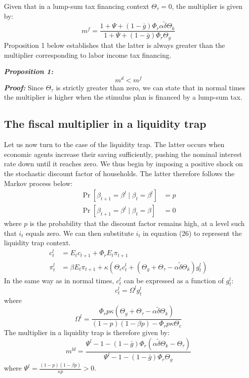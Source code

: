 \documentclass[12pt,letterpaper]{article}
\newcommand{\Et}{E_t}
\newcommand{\gbar}{\bar{g}}
\newcommand{\dtilde}{\tilde{\delta}}
\newcommand{\Theg}{\Theta_g}
\newcommand{\Thec}{\Theta_c}
\newcommand{\Thek}{\Theta_k}
\newcommand{\Thet}{\Theta_\tau}
\newcommand{\Phir}{\Phi_r}
\begin{document}
Given that in a lump-sum tax financing context $\Thet = 0$, the multiplier is given by:
\begin{equation}
m^f = \frac{1 + \Psi + (1-\gbar)\Phir\alpha\dtilde\Thek}{1 + \Psi + (1-\gbar)\Phir\Theg} \tag{45}
\end{equation}
Proposition 1 below establishes that the latter is always greater than the multiplier corresponding to labor income tax financing.

\medskip
\noindent\textbf{\emph{Proposition 1:}}
\begin{equation}
m^d < m^f \tag{46}
\end{equation}
\noindent\textbf{\emph{Proof:}} Since $\Thet$ is strictly greater than zero, we can state that in normal times the multiplier is higher when the stimulus plan is financed by a lump-sum tax.

\subsection{The fiscal multiplier in a liquidity trap}

Let us now turn to the case of the liquidity trap. The latter occurs when economic agents increase their saving sufficiently, pushing the nominal interest rate down until it reaches zero. We thus begin by imposing a positive shock on the stochastic discount factor of households. The latter therefore follows the Markov process below:
\begin{align}
\Pr[\beta_{t+1} = \beta^l \mid \beta_t = \beta^l] &= p \nonumber\\
\Pr[\beta_{t+1} = \beta^l \mid \beta_t = \beta] &= 0 \tag{47}
\end{align}
where $p$ is the probability that the discount factor remains high, at a level such that $i_t$ equals zero. We can then substitute $i_t$ in equation (26) to represent the liquidity trap context.
\begin{align}
c^l_t &= \Et c_{t+1} + \Phir\Et\pi_{t+1} \tag{48}\\
\pi^l_t &= \beta\Et\pi_{t+1} + \kappa\left(\Thec c^l_t + (\Theg + \Thet - \alpha\dtilde\Thek)g^l_t\right) \tag{49}
\end{align}
In the same way as in normal times, $c^l_t$ can be expressed as a function of $g^l_t$:
\begin{equation}
c^l_t = \Omega^l g^l_t \tag{50}
\end{equation}
where
\begin{equation}
\Omega^l = \frac{\Phir p\kappa\left(\Theg + \Thet - \alpha\dtilde\Thek\right)}{(1-p)(1-\beta p) - \Phir p\kappa\Thec} \tag{51}
\end{equation}
The multiplier in a liquidity trap is therefore given by:
\begin{equation}
m^{ld} = \frac{\Psi^l - 1 - (1-\gbar)\Phir\left(\alpha\dtilde\Thek - \Thet\right)}{\Psi^l - 1 - (1-\gbar)\Phir\Theg} \tag{52}
\end{equation}
where $\Psi^l = \frac{(1-p)(1-\beta p)}{\kappa p} > 0$.
\end{document}
